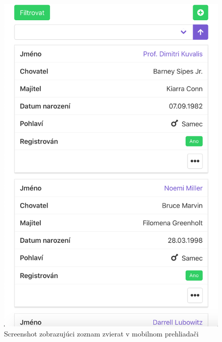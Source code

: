 \begin{figure}[H]
	\includegraphics[width=1.0\textwidth]{media/priloha/mobil/2.png}
	\caption{Screenshot zobrazujúci zoznam zvierat v mobilnom prehliadači}
\end{figure}

